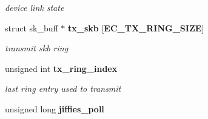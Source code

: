 \begin{DoxyCompactItemize}
\begin{DoxyCompactList}\small\item\em device link state \end{DoxyCompactList}\item 
struct sk\-\_\-buff $\ast$ {\bf tx\-\_\-skb} [{\bf E\-C\-\_\-\-T\-X\-\_\-\-R\-I\-N\-G\-\_\-\-S\-I\-Z\-E}]\label{structec__device_a733aeb60035ac3696f05dc33adf49004}

\begin{DoxyCompactList}\small\item\em transmit skb ring \end{DoxyCompactList}\item 
unsigned int {\bf tx\-\_\-ring\-\_\-index}\label{structec__device_af9353b63b910b0b64d06837b3f7075b7}

\begin{DoxyCompactList}\small\item\em last ring entry used to transmit \end{DoxyCompactList}\item 
unsigned long {\bf jiffies\-\_\-poll}\label{structec__device_af98c616a488455db59c5c4297206b8fb}


\end{DoxyCompactItemize}
